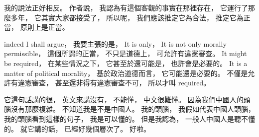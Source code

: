 \hypertarget{w02:cue:640}{}我的說法正好相反。
\hypertarget{w02:cue:641}{}作者說，
\hypertarget{w02:cue:642}{}我認為有這個客觀的事實在那裡存在，
\hypertarget{w02:cue:643}{}它運行了那麼多年，
\hypertarget{w02:cue:644}{}它其實大家都接受了，
\hypertarget{w02:cue:645}{}所以呢，
\hypertarget{w02:cue:646}{}我們應該推定它為合法，
\hypertarget{w02:cue:647}{}推定它為正當，
\hypertarget{w02:cue:648}{}原則上是正當。

\hypertarget{w02:cue:649}{}indeed
\hypertarget{w02:cue:650}{}I shall argue，
\hypertarget{w02:cue:651}{}我要主張的是，
\hypertarget{w02:cue:652}{}It is only，
\hypertarget{w02:cue:653}{}It is not only morally permissible，
\hypertarget{w02:cue:654}{}這個所謂的正當，
\hypertarget{w02:cue:655}{}不只是道德上，
\hypertarget{w02:cue:656}{}可允許有違憲審查。
\hypertarget{w02:cue:657}{}It might be required，
\hypertarget{w02:cue:658}{}在某些情況之下，
\hypertarget{w02:cue:659}{}它甚至於還可能是，
\hypertarget{w02:cue:660}{}也許會是必要的。
\hypertarget{w02:cue:661}{}It is a matter of political morality，
\hypertarget{w02:cue:662}{}基於政治道德而言，
\hypertarget{w02:cue:663}{}它可能還是必要的。
\hypertarget{w02:cue:664}{}不僅是允許有違憲審查，
\hypertarget{w02:cue:665}{}甚至還非得有違憲審查不可，
\hypertarget{w02:cue:666}{}所以才叫 required。

\hypertarget{w02:cue:667}{}它這句話講的很，
\hypertarget{w02:cue:668}{}英文來講沒有，
\hypertarget{w02:cue:669}{}不能懂，
\hypertarget{w02:cue:670}{}中文很難懂。
\hypertarget{w02:cue:671}{}因為我們中國人的頭腦沒有那麼複雜。
\hypertarget{w02:cue:672}{}不知道我是不是中國人。
\hypertarget{w02:cue:673}{}我的頭腦，
\hypertarget{w02:cue:674}{}我假如代表中國人頭腦，
\hypertarget{w02:cue:675}{}我的頭腦看到這樣的句子，
\hypertarget{w02:cue:676}{}我是可以懂的。
\hypertarget{w02:cue:677}{}但是我認為，
\hypertarget{w02:cue:678}{}一般人中國人是聽不懂的。
\hypertarget{w02:cue:679}{}就它講的話，
\hypertarget{w02:cue:680}{}已經好幾個層次了。
\hypertarget{w02:cue:681}{}好啦。

